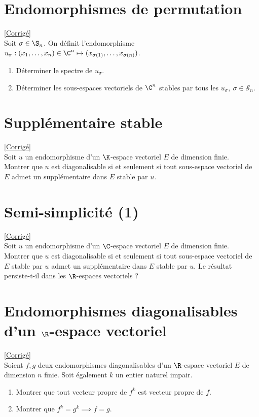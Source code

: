 \documentclass[8pt]{book}
\begin{document}
	\section{Endomorphismes de permutation }
	\label{Endomorphismes de permutation}
	\textcolor{blue}{\hyperref[Endomorphismes de permutation corrigé]{[Corrigé]}}\\
	Soit $\sigma\in \S_n$. On définit l'endomorphisme $u_\sigma : (x_1,\dots,x_n)\in \C^n\mapsto (x_{\sigma(1)},\dots,x_{\sigma(n)})$.
	\begin{enumerate}
		\item Déterminer le spectre de $u_\sigma$.
		\item Déterminer les sous-espaces vectoriels de $\C^n$ stables par tous les $u_\sigma,\ \sigma\in \mathcal S_n$.
	\end{enumerate}
	
	
	\section{Supplémentaire stable }
	\label{Supplémentaire stable}
	\textcolor{blue}{\hyperref[Supplémentaire stable corrigé]{[Corrigé]}}\\
	Soit $u$ un endomorphisme d'un $\K$-espace vectoriel $E$ de dimension finie.\\
	Montrer que $u$ est diagonalisable si et seulement si tout sous-espace vectoriel de $E$ admet un supplémentaire dans $E$ stable par $u$.
	
	\section{Semi-simplicité (1) }
	\label{Semi-simplicité (1)}
	\textcolor{blue}{\hyperref[Semi-simplicité (1) corrigé]{[Corrigé]}}\\
	Soit $u$ un endomorphisme d'un $\C$-espace vectoriel $E$ de dimension finie.\\
	Montrer que $u$ est diagonalisable si et seulement si tout sous-espace vectoriel de $E$ stable par $u$ admet un supplémentaire dans $E$ stable par $u$. Le résultat persiste-t-il dans les $\R$-espaces vectoriels ?
	
	\section{Endomorphismes diagonalisables d'un $\R$-espace vectoriel }
	\label{Endomorphismes diagonalisables d'un R-espace vectoriel}
	\textcolor{blue}{\hyperref[Endomorphismes diagonalisables d'un R-espace vectoriel corrigé]{[Corrigé]}}\\
	Soient $f,g$ deux endomorphismes diagonalisables d'un $\R$-espace vectoriel $E$ de dimension $n$ finie. Soit également $k$ un entier naturel impair.
	\begin{enumerate}
		\item Montrer que tout vecteur propre de $f^k$ est vecteur propre de $f$.
		\item Montrer que $f^k=g^k\implies f=g$.
	\end{enumerate}
	
\end{document}
